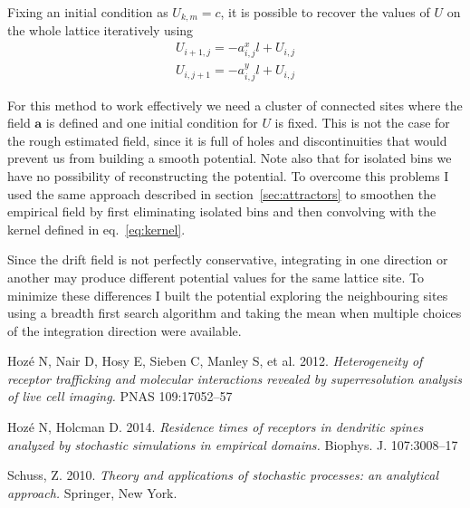 \documentclass[a4paper]{article}
\begin{document}
Fixing an initial condition as $U_{k,m} = c$, it is possible to recover the values of $U$ on the whole lattice iteratively using
\begin{align}
U_{i+1,j} = -a^x_{i,j}l + U_{i,j} \\[10pt]
U_{i,j+1} = -a^y_{i,j}l + U_{i,j}
\end{align}

For this method to work effectively we need a cluster of connected sites where the field $\bm{a}$ is defined and one initial condition for $U$ is fixed. This is not the case for the rough estimated field, since it is full of holes and discontinuities that would prevent us from building a smooth potential. Note also that for isolated bins we have no possibility of reconstructing the potential. To overcome this problems I used the same approach described in section~\ref{sec:attractors} to smoothen the empirical field by first eliminating isolated bins and then convolving with the kernel defined in eq.~\ref{eq:kernel}.

Since the drift field is not perfectly conservative, integrating in one direction or another may produce different potential values for the same lattice site. To minimize these differences I built the potential exploring the neighbouring sites using a breadth first search algorithm and taking the mean when multiple choices of the integration direction were available.



\clearpage

\begin{thebibliography}{9}
Hoz\'e N, Nair D, Hosy E, Sieben C, Manley S, et al. 2012. \textit{Heterogeneity of receptor trafficking and molecular interactions revealed by superresolution analysis of live cell imaging.} PNAS 109:17052–57

Hoz\'e N, Holcman D. 2014. \textit{Residence times of receptors in dendritic spines analyzed by stochastic simulations in empirical domains.} Biophys. J. 107:3008–17

Schuss, Z. 2010. \textit{Theory and applications of stochastic processes: an analytical approach.} Springer, New York.

\end{thebibliography}
\end{document}
